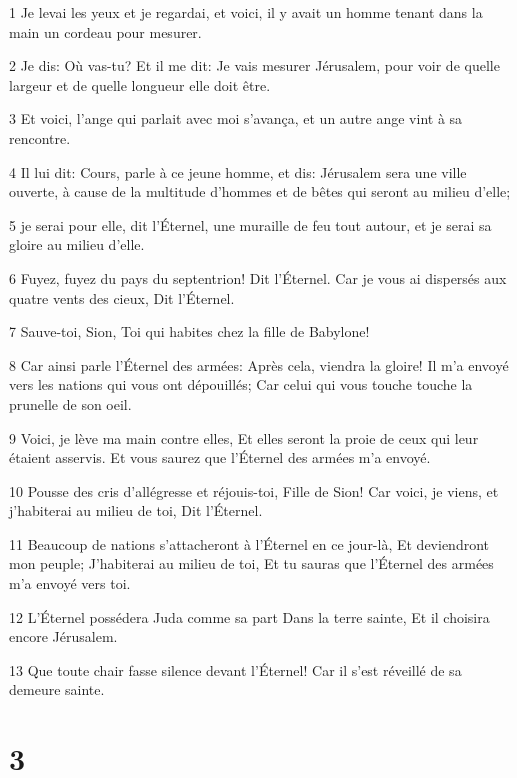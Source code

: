 \par 1 Je levai les yeux et je regardai, et voici, il y avait un homme tenant dans la main un cordeau pour mesurer.
\par 2 Je dis: Où vas-tu? Et il me dit: Je vais mesurer Jérusalem, pour voir de quelle largeur et de quelle longueur elle doit être.
\par 3 Et voici, l'ange qui parlait avec moi s'avança, et un autre ange vint à sa rencontre.
\par 4 Il lui dit: Cours, parle à ce jeune homme, et dis: Jérusalem sera une ville ouverte, à cause de la multitude d'hommes et de bêtes qui seront au milieu d'elle;
\par 5 je serai pour elle, dit l'Éternel, une muraille de feu tout autour, et je serai sa gloire au milieu d'elle.
\par 6 Fuyez, fuyez du pays du septentrion! Dit l'Éternel. Car je vous ai dispersés aux quatre vents des cieux, Dit l'Éternel.
\par 7 Sauve-toi, Sion, Toi qui habites chez la fille de Babylone!
\par 8 Car ainsi parle l'Éternel des armées: Après cela, viendra la gloire! Il m'a envoyé vers les nations qui vous ont dépouillés; Car celui qui vous touche touche la prunelle de son oeil.
\par 9 Voici, je lève ma main contre elles, Et elles seront la proie de ceux qui leur étaient asservis. Et vous saurez que l'Éternel des armées m'a envoyé.
\par 10 Pousse des cris d'allégresse et réjouis-toi, Fille de Sion! Car voici, je viens, et j'habiterai au milieu de toi, Dit l'Éternel.
\par 11 Beaucoup de nations s'attacheront à l'Éternel en ce jour-là, Et deviendront mon peuple; J'habiterai au milieu de toi, Et tu sauras que l'Éternel des armées m'a envoyé vers toi.
\par 12 L'Éternel possédera Juda comme sa part Dans la terre sainte, Et il choisira encore Jérusalem.
\par 13 Que toute chair fasse silence devant l'Éternel! Car il s'est réveillé de sa demeure sainte.

\chapter{3}

